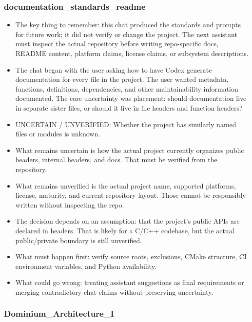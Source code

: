 \documentclass[11pt,a4paper]{report}
\begin{document}
\subsubsection{documentation\_standards\_readme}

\begin{itemize}
\item The key thing to remember: this chat produced the standards and prompts for future work; it did not verify or change the project. The next assistant must inspect the actual repository before writing repo-specific docs, README content, platform claims, license claims, or subsystem descriptions.
\item The chat began with the user asking how to have Codex generate documentation for every file in the project. The user wanted metadata, functions, definitions, dependencies, and other maintainability information documented. The core uncertainty was placement: should documentation live in separate sister files, or should it live in file headers and function headers?
\item UNCERTAIN / UNVERIFIED: Whether the project has similarly named files or modules is unknown.
\item What remains uncertain is how the actual project currently organizes public headers, internal headers, and docs. That must be verified from the repository.
\item What remains unverified is the actual project name, supported platforms, license, maturity, and current repository layout. Those cannot be responsibly written without inspecting the repo.
\item The decision depends on an assumption: that the project's public APIs are declared in headers. That is likely for a C/C++ codebase, but the actual public/private boundary is still unverified.
\item What must happen first: verify source roots, exclusions, CMake structure, CI environment variables, and Python availability.
\item What could go wrong: treating assistant suggestions as final requirements or merging contradictory chat claims without preserving uncertainty.
\end{itemize}

\subsubsection{Dominium\_Architecture\_I}
\end{document}
